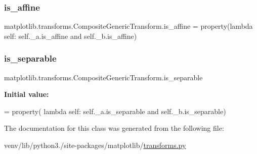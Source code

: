 \subsubsection{\texorpdfstring{is\+\_\+affine}{is\_affine}}
{\footnotesize\ttfamily matplotlib.\+transforms.\+Composite\+Generic\+Transform.\+is\+\_\+affine = property(lambda self\+: self.\+\_\+a.\+is\+\_\+affine and self.\+\_\+b.\+is\+\_\+affine)\hspace{0.3cm}{\ttfamily [static]}}

\mbox{\label{classmatplotlib_1_1transforms_1_1CompositeGenericTransform_ad1e427a3197189b337fd6a267033b543}} 
\subsubsection{\texorpdfstring{is\+\_\+separable}{is\_separable}}
{\footnotesize\ttfamily matplotlib.\+transforms.\+Composite\+Generic\+Transform.\+is\+\_\+separable\hspace{0.3cm}{\ttfamily [static]}}

{\bfseries Initial value\+:}
\begin{DoxyCode}
=  property(
        \textcolor{keyword}{lambda} self: self.\_a.is\_separable \textcolor{keywordflow}{and} self.\_b.is\_separable)
\end{DoxyCode}


The documentation for this class was generated from the following file\+:\begin{DoxyCompactItemize}
\item 
venv/lib/python3./site-\/packages/matplotlib/\hyperlink{transforms_8py}{transforms.\+py}\end{DoxyCompactItemize}
